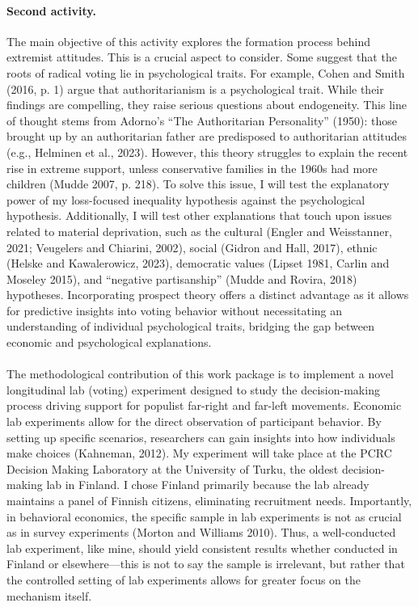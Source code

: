 \documentclass[letterpaper]{article}
\begin{document}
\paragraph{Second activity.} The main objective of this activity explores the formation process behind extremist attitudes. This is a crucial aspect to consider. Some suggest that the roots of radical voting lie in psychological traits. For example, Cohen and Smith (2016, p. 1) argue that authoritarianism is a psychological trait. While their findings are compelling, they raise serious questions about endogeneity. This line of thought stems from Adorno’s “The Authoritarian Personality” (1950): those brought up by an authoritarian father are predisposed to authoritarian attitudes (e.g., Helminen et al., 2023). However, this theory struggles to explain the recent rise in extreme support, unless conservative families in the 1960s had more children (Mudde 2007, p. 218). To solve this issue, I will test the explanatory power of my loss-focused inequality hypothesis against the psychological hypothesis. Additionally, I will test other explanations that touch upon issues related to material deprivation, such as the cultural (Engler and Weisstanner, 2021; Veugelers and Chiarini, 2002), social (Gidron and Hall, 2017), ethnic (Helske and Kawalerowicz, 2023), democratic values (Lipset 1981, Carlin and Moseley 2015), and “negative partisanship” (Mudde and Rovira, 2018) hypotheses. Incorporating prospect theory offers a distinct advantage as it allows for predictive insights into voting behavior without necessitating an understanding of individual psychological traits, bridging the gap between economic and psychological explanations.

\paragraph{}The methodological contribution of this work package is to implement a novel longitudinal lab (voting) experiment designed to study the decision-making process driving support for populist far-right and far-left movements. Economic lab experiments allow for the direct observation of participant behavior. By setting up specific scenarios, researchers can gain insights into how individuals make choices (Kahneman, 2012). My experiment will take place at the PCRC Decision Making Laboratory at the University of Turku, the oldest decision-making lab in Finland.  I chose Finland primarily because the lab already maintains a panel of Finnish citizens, eliminating recruitment needs. Importantly, in behavioral economics, the specific sample in lab experiments is not as crucial as in survey experiments (Morton and Williams 2010). Thus, a well-conducted lab experiment, like mine, should yield consistent results whether conducted in Finland or elsewhere—this is not to say the sample is irrelevant, but rather that the controlled setting of lab experiments allows for greater focus on the mechanism itself.
\end{document}
